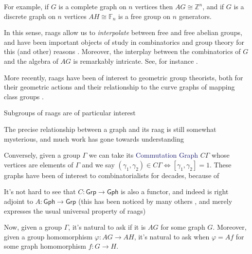 \documentclass[12pt]{article}
\theoremstyle{definition}
\theoremstyle{theorem}
\newcommand*{\important}[1]{\textcolor{MidnightBlue}{#1}}
\begin{document}
    For example, if $G$ is a complete graph on $n$ vertices then 
    $AG \cong \mathbb{Z}^n$, and if $G$ is a discrete graph on $n$ vertices
    $AH \cong \mathbb{F}_n$ is a free group on $n$ generators. 

    In this sense, raags allow us to \emph{interpolate} between free and free
    abelian groups, and have been important objects of study in combinatorics
    and group theory for this (and other) reasons . 
    Moreover, the interplay between the combinatorics of $G$ and the 
    algebra of $AG$ is remarkably intricate. See, for instance 
    .

    More recently, raags have been of interest to geometric group theorists,
    both for their geometric actions 
    and their relationship to the curve graphs of mapping class groups
    .


    Subgroups of raags are of particular interest 

    The precise relationship between a graph and its raag is still somewhat
    mysterious, and much work has gone towards understanding 

    Conversely, given a group $\Gamma$ we can take its \important{Commutation Graph}
    $C\Gamma$ whose vertices are elements of $\Gamma$ and we say 
    $(\gamma_1, \gamma_2) \in C\Gamma \iff [\gamma_1, \gamma_2] = 1$.
    These graphs have been of interest to combinatorialists 
    for decades, because of 

    It's not hard to see that $C : \mathsf{Grp} \to \mathsf{Gph}$ is also a 
    functor, and indeed is right adjoint to $A : \mathsf{Gph} \to \mathsf{Grp}$
    (this has been noticed by many others , and merely 
    expresses the usual universal property of raags)

    Now, given a group $\Gamma$, it's natural to ask if it is $AG$ for some 
    graph $G$. Moreover, given a group homomorphism $\varphi : AG \to AH$, it's 
    natural to ask when $\varphi = Af$ for some graph homomorphism $f : G \to H$.
\end{document}
